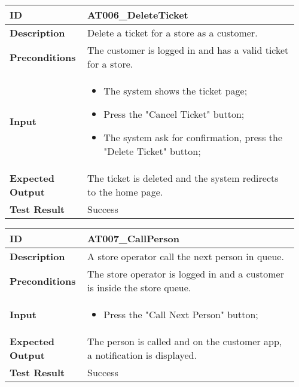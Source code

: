 \begin{table}[H]
	\centering
	\begin{tabular}{@{}p{0.25\linewidth}p{0.71\linewidth}@{}}
		\toprule
		\textbf{ID} & AT006\_DeleteTicket \\
		\midrule
		\textbf{Description} & Delete a ticket for a store as a customer. \\
		\midrule
		\textbf{Preconditions} & The customer is logged in and has a valid ticket for a store.\\
		\midrule
		\textbf{Input} & \begin{itemize}[leftmargin=.4cm,noitemsep,topsep=0pt,before=\vspace{-3mm},after=\vspace{-4mm}]
			\item The system shows the ticket page;
			\item Press the "Cancel Ticket" button;
			\item The system ask for confirmation, press the "Delete Ticket" button;
		\end{itemize}\\
		\midrule
		\textbf{Expected Output} & The ticket is deleted and the system redirects to the home page.\\
		\midrule
		\textbf{Test Result} & Success\\
		\bottomrule
	\end{tabular}
\end{table}

\begin{table}[H]
	\centering
	\begin{tabular}{@{}p{0.25\linewidth}p{0.71\linewidth}@{}}
		\toprule
		\textbf{ID} & AT007\_CallPerson \\
		\midrule
		\textbf{Description} & A store operator call the next person in queue. \\
		\midrule
		\textbf{Preconditions} & The store operator is logged in and a customer is inside the store queue.\\
		\midrule
		\textbf{Input} & \begin{itemize}[leftmargin=.4cm,noitemsep,topsep=0pt,before=\vspace{-3mm},after=\vspace{-4mm}]
			\item Press the "Call Next Person" button;
		\end{itemize}\\
		\midrule
		\textbf{Expected Output} & The person is called and on the customer app, a notification is displayed.\\
		\midrule
		\textbf{Test Result} & Success\\
		\bottomrule
	\end{tabular}
\end{table}

